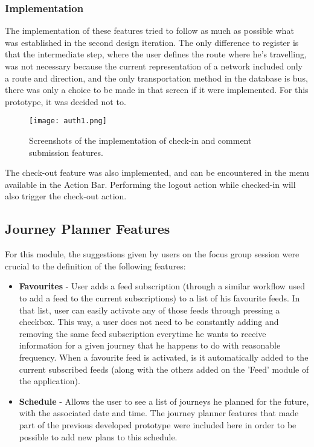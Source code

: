 \newpage
\subsubsection{Implementation}

The implementation of these features tried to follow as much as possible what was established in the second design iteration. The only difference to register is that the intermediate step, where the user defines the route where he's travelling, was not necessary because the current representation of a network included only a route and direction, and the only transportation method in the database is bus, there was only a choice to be made in that screen if it were implemented. For this prototype, it was decided not to.

\begin{figure}[h!]
  \begin{center}
    \leavevmode
    \texttt{[image: auth1.png]}
    \caption{Screenshots of the implementation of check-in and comment submission features.}
    \label{fig:comment_impl}
  \end{center}
\end{figure}

The check-out feature was also implemented, and can be encountered in the menu available in the Action Bar. Performing the logout action while checked-in will also trigger the check-out action.

\subsection{Journey Planner Features}\label{journeyplanner}

For this module, the suggestions given by users on the focus group session were crucial to the definition of the following features:

\begin{itemize}
\item \textbf{Favourites} - User adds a feed subscription (through a similar workflow used to add a feed to the current subscriptions) to a list of his favourite feeds. In that list, user can easily activate any of those feeds through pressing a checkbox. This way, a user does not need to be constantly adding and removing the same feed subscription everytime he wants to receive information for a given journey that he happens to do with reasonable frequency.
When a favourite feed is activated, is it automatically added to the current subscribed feeds (along with the others added on the 'Feed' module of the application).
\item \textbf{Schedule} - Allows the user to see a list of journeys he planned for the future, with the associated date and time. The journey planner features that made part of the previous developed prototype \cite{kn:Gon12} were included here in order to be possible to add new plans to this schedule.
\end{itemize} 

